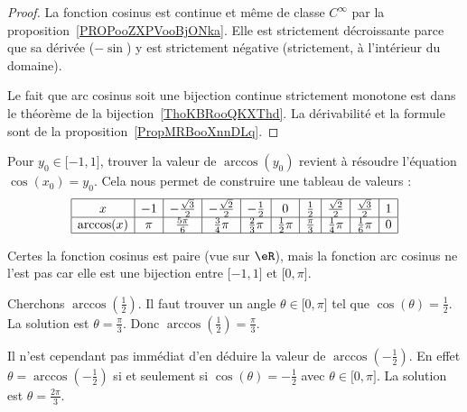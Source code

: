 	\begin{proof}
		La fonction cosinus est continue et même de classe \(  C^{\infty}\) par la proposition~\ref{PROPooZXPVooBjONka}. Elle est strictement décroissante parce que sa dérivée (\( -\sin\)) y est strictement négative (strictement, à l'intérieur du domaine).

		Le fait que arc cosinus soit une bijection continue strictement monotone est dans le théorème de la bijection~\ref{ThoKBRooQKXThd}. La dérivabilité et la formule sont de la proposition~\ref{PropMRBooXnnDLq}.
	\end{proof}

	Pour \( y_0\in\mathopen[ -1 , 1 \mathclose]\), trouver la valeur de \( \arccos(y_0)\) revient à résoudre l'équation \( \cos(x_0)=y_0\). Cela nous permet de construire une tableau de valeurs :
	\begin{equation*}
		\begin{array}[]{|c|c|c|c|c|c|c|c|c|c|}
			\hline
			x          & -1  & -\frac{ \sqrt{3} }{2} & -\frac{ \sqrt{2} }{2} & -\frac{ 1 }{2}     & 0                & \frac{ 1 }{2}     & \frac{ \sqrt{2} }{2} & \frac{ \sqrt{3} }{2} & 1 \\
			\hline
			\arccos(x) & \pi & \frac{ 5\pi }{ 6 }    & \frac{ 3 }{ 4 }\pi    & \frac{ 2 }{ 3 }\pi & \frac{ 1 }{2}\pi & \frac{ \pi }{ 3 } & \frac{1}{ 4 }\pi     & \frac{1}{ 6 }\pi     & 0 \\
			\hline
		\end{array}
	\end{equation*}

	\begin{remark}
		Certes la fonction cosinus est paire (vue sur \( \eR\)), mais la fonction arc cosinus ne l'est pas car elle est une bijection entre \(\mathopen[ -1 , 1 \mathclose]\) et \(\mathopen[ 0 , \pi \mathclose]\).
	\end{remark}

	\begin{example}
		Cherchons \( \arccos(\frac{ 1 }{2})\). Il faut trouver un angle \( \theta\in\mathopen[ 0 , \pi \mathclose]\) tel que \( \cos(\theta)=\frac{ 1 }{2}\). La solution est \( \theta=\frac{ \pi }{ 3 }\). Donc \( \arccos(\frac{ 1 }{2})=\frac{ \pi }{ 3 }\).

		Il n'est cependant pas immédiat d'en déduire la valeur de \( \arccos(-\frac{ 1 }{2})\). En effet \( \theta=\arccos(-\frac{ 1 }{2})\) si et seulement si \( \cos(\theta)=-\frac{ 1 }{2}\) avec \( \theta\in\mathopen[ 0 , \pi \mathclose]\). La solution est \( \theta=\frac{ 2\pi }{ 3 }\).
	\end{example}

